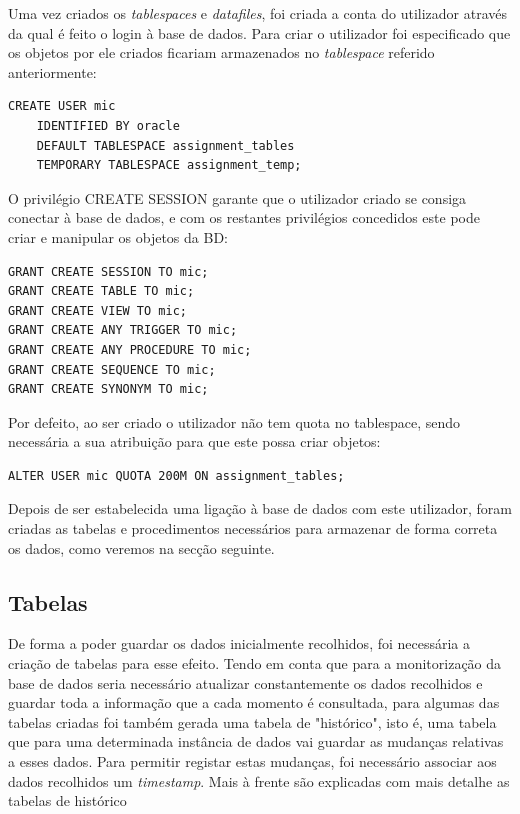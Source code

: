 Uma vez criados os \textit{tablespaces} e \textit{datafiles}, foi criada a conta do utilizador através da qual é feito o login à base de dados. Para criar o utilizador foi especificado que os objetos por ele criados ficariam armazenados no \textit{tablespace}  referido anteriormente:

\begin{verbatim}
CREATE USER mic
    IDENTIFIED BY oracle
    DEFAULT TABLESPACE assignment_tables
    TEMPORARY TABLESPACE assignment_temp;

\end{verbatim}


O privilégio CREATE SESSION garante que o utilizador criado se consiga conectar à base de dados, e com os restantes privilégios concedidos este pode criar e manipular os objetos da BD:

\begin{verbatim}
GRANT CREATE SESSION TO mic;
GRANT CREATE TABLE TO mic;
GRANT CREATE VIEW TO mic;
GRANT CREATE ANY TRIGGER TO mic;
GRANT CREATE ANY PROCEDURE TO mic;
GRANT CREATE SEQUENCE TO mic;
GRANT CREATE SYNONYM TO mic;
\end{verbatim}

Por defeito, ao ser criado o utilizador não tem quota no tablespace, sendo necessária a sua atribuição para que este possa criar objetos:
\begin{verbatim}
ALTER USER mic QUOTA 200M ON assignment_tables;
\end{verbatim}

Depois de ser estabelecida uma ligação à base de dados com este utilizador, foram criadas as tabelas e procedimentos necessários para armazenar de forma correta os dados, como veremos na secção seguinte.

\subsection*{Tabelas}
De forma a poder guardar os dados inicialmente recolhidos, foi necessária a criação de tabelas para esse efeito. Tendo em conta que para a monitorização da base de dados seria necessário atualizar  constantemente os dados recolhidos e guardar toda a informação que a cada momento é consultada, para algumas das tabelas criadas foi também gerada uma tabela de "histórico", isto é, uma tabela que para uma determinada instância de dados vai guardar as mudanças relativas a esses dados. Para permitir registar estas mudanças, foi necessário associar aos dados recolhidos um \textit{timestamp}. Mais à frente são explicadas com mais detalhe as tabelas de histórico

